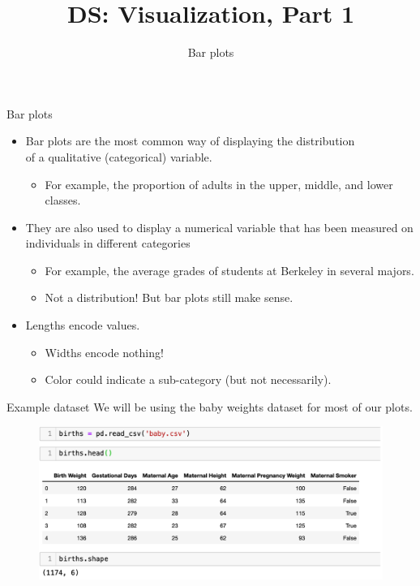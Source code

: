 \documentclass[aspectratio=169]{../latex_main/tntbeamer}  %
\title[Visualization]{DS: Visualization, Part 1}
\subtitle{Bar plots}
\begin{document}
	
	\maketitle
	\begin{frame}{Bar plots}
	    \begin{itemize}
	        \item Bar plots are the most common way of displaying the distribution\\ of a qualitative (categorical) variable.
	        \begin{itemize}
	            \item For example, the proportion of adults in the upper, middle, and lower classes.
	        \end{itemize}
	        \item They are also used to display a numerical variable that has been measured on individuals in different categories
	        \begin{itemize}
	            \item For example, the average grades of students at Berkeley in several majors.
	            \item Not a distribution! But bar plots still make sense.
	        \end{itemize}
	        \item Lengths encode values.
	        \begin{itemize}
	            \item Widths encode nothing!
	            \item Color could indicate a sub-category (but not necessarily).
	        \end{itemize}
	    \end{itemize}
	\end{frame}
	
	
	
	\begin{frame}{Example dataset}
	    We will be using the baby weights dataset for most of our plots.
	    \begin{figure}
	        \centering
            \includegraphics[scale=.45]{Bild21}
	    \end{figure}
	\end{frame}
	
\end{document}
